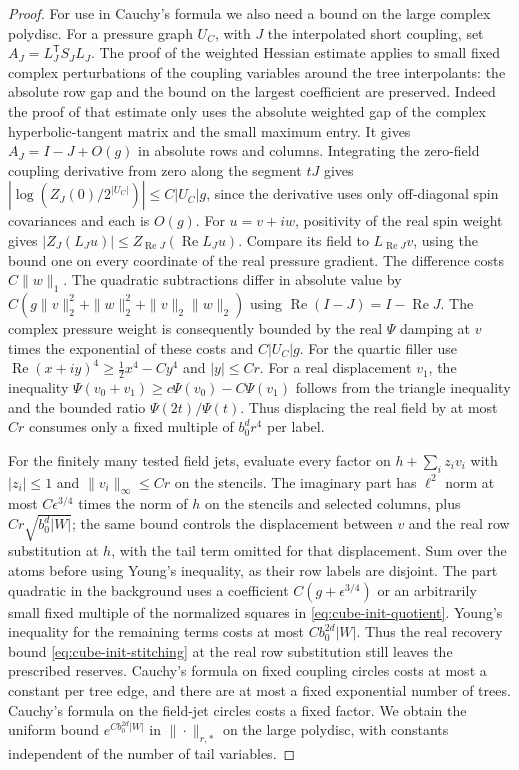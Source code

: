 \documentclass[11pt]{article}
\theoremstyle{definition}
\begin{document}
\begin{proof}
For use in Cauchy's formula we also need a bound on the
large complex polydisc. For a pressure graph \(U_C\), with
\(J\) the interpolated short coupling, set
\(A_J=L_J^{\mathsf T}S_JL_J\). The proof of the weighted
Hessian estimate applies to small fixed complex perturbations
of the coupling variables around the tree interpolants:
the absolute row gap and the bound on the largest coefficient
are preserved. Indeed the proof of that estimate only uses the
absolute weighted gap of the complex hyperbolic-tangent matrix
and the small maximum entry. It gives \(A_J=I-J+O(g)\) in absolute rows
and columns. Integrating the zero-field coupling derivative
from zero along the segment \(tJ\) gives
\(|\log(Z_J(0)/2^{|U_C|})|\le C|U_C|g\), since the derivative
uses only off-diagonal spin covariances and each is \(O(g)\).
For \(u=v+iw\), positivity of the real spin weight gives
\(|Z_J(L_Ju)|\le Z_{\operatorname{Re}J}(\operatorname{Re}L_Ju)\).
Compare its field to \(L_{\operatorname{Re}J}v\), using the
bound one on every coordinate of the real pressure gradient.
The difference costs \(C\|w\|_1\).
The quadratic subtractions differ in absolute value by
\(C(g\|v\|_2^2+\|w\|_2^2+\|v\|_2\|w\|_2)\) using
\(\operatorname{Re}(I-J)=I-\operatorname{Re}J\).
The complex pressure weight is consequently bounded by
the real \(\Psi\) damping at \(v\) times the exponential of
these costs and \(C|U_C|g\). For the quartic filler use \(\operatorname{Re}(x+iy)^4\ge
\tfrac12 x^4-Cy^4\) and \(|y|\le Cr\). For a real
displacement \(v_1\), the inequality
\(\Psi(v_0+v_1)\ge c\Psi(v_0)-C\Psi(v_1)\) follows from the
triangle inequality and the bounded ratio \(\Psi(2t)/\Psi(t)\).
Thus displacing the real field by at most \(Cr\) consumes
only a fixed multiple of \(b_0^d r^4\) per label.

For the finitely many tested field jets, evaluate every
factor on \(h+\sum_i z_i v_i\) with \(|z_i|\le1\) and
\(\|v_i\|_\infty\le Cr\) on the stencils. The imaginary part
has \(\ell^2\) norm at most \(C\epsilon^{3/4}\) times the norm
of \(h\) on the stencils and selected columns, plus
\(Cr\sqrt{b_0^d|W|}\); the same bound controls the displacement
between \(v\) and the real row substitution at \(h\), with the
tail term omitted for that displacement. Sum over the atoms
before using Young's inequality, as their row labels are
disjoint. The part quadratic in the background uses a coefficient
\(C(g+\epsilon^{3/4})\) or an arbitrarily small fixed multiple
of the normalized squares in \eqref{eq:cube-init-quotient}.
Young's inequality for the remaining terms costs at most
\(C b_0^{2d}|W|\). Thus the real recovery bound
\eqref{eq:cube-init-stitching} at the real row substitution
still leaves the prescribed reserves. Cauchy's formula on fixed
coupling circles costs at most a constant per tree edge, and
there are at most a fixed exponential number of trees. Cauchy's
formula on the field-jet circles costs a fixed factor. We obtain
the uniform bound \(e^{C b_0^{2d}|W|}\) in \(\|\cdot\|_{r,*}\)
on the large polydisc, with constants independent of the number
of tail variables.


\end{proof}
\end{document}
